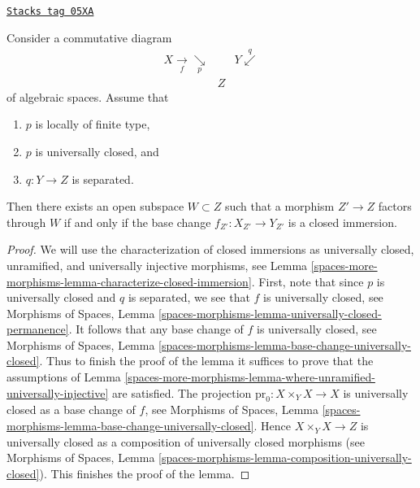 \begin{lemma}
\label{spaces-more-morphisms-lemma-where-closed-immersion}
\href{https://stacks.math.columbia.edu/tag/05XA}{\texttt{Stacks tag 05XA}}

Consider a commutative diagram
$$
\begin{array}{ccc}X \underset{f}{\longrightarrow}\underset{p}{\searrow} &  & Y \overset{q}{\swarrow} \\  & Z & \end{array}
$$
of algebraic spaces. Assume that
\begin{enumerate}
\item $p$ is locally of finite type,
\item $p$ is universally closed, and
\item $q : Y \to Z$ is separated.
\end{enumerate}
Then there exists an open subspace $W \subset Z$
such that a morphism $Z' \to Z$ factors through $W$ if and only if the
base change $f_{Z'} : X_{Z'} \to Y_{Z'}$ is a closed immersion.
\end{lemma}

\begin{proof}
We will use the characterization of closed immersions as
universally closed, unramified, and universally injective morphisms, see
Lemma \ref{spaces-more-morphisms-lemma-characterize-closed-immersion}.
First, note that since $p$ is universally closed and $q$ is
separated, we see that $f$ is universally closed, see
Morphisms of Spaces, Lemma
\ref{spaces-morphisms-lemma-universally-closed-permanence}.
It follows that any base change of $f$ is universally closed, see
Morphisms of Spaces, Lemma
\ref{spaces-morphisms-lemma-base-change-universally-closed}.
Thus to finish the proof of the lemma it suffices to prove that
the assumptions of
Lemma \ref{spaces-more-morphisms-lemma-where-unramified-universally-injective}
are satisfied. The projection $\text{pr}_0 : X \times_Y X \to X$
is universally closed as a base change of $f$, see
Morphisms of Spaces, Lemma
\ref{spaces-morphisms-lemma-base-change-universally-closed}.
Hence $X \times_Y X \to Z$ is universally closed as
a composition of universally closed morphisms (see
Morphisms of Spaces, Lemma
\ref{spaces-morphisms-lemma-composition-universally-closed}).
This finishes the proof of the lemma.
\end{proof}


